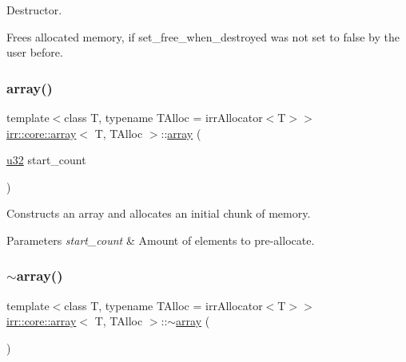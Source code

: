 Destructor. 

Frees allocated memory, if set\+\_\+free\+\_\+when\+\_\+destroyed was not set to false by the user before. \mbox{\label{classirr_1_1core_1_1array_ab58c4b2c09693190b43ee16e99722b43}} 
\subsubsection{\texorpdfstring{array()}{array()}\hspace{0.1cm}{\footnotesize\ttfamily [2/2]}}
{\footnotesize\ttfamily template$<$class T, typename T\+Alloc = irr\+Allocator$<$\+T$>$$>$ \\
\hyperlink{classirr_1_1core_1_1array}{irr\+::core\+::array}$<$ T, T\+Alloc $>$\+::\hyperlink{classirr_1_1core_1_1array}{array} (\begin{DoxyParamCaption}\item[{\hyperlink{namespaceirr_a0416a53257075833e7002efd0a18e804}{u32}}]{start\+\_\+count }\end{DoxyParamCaption})\hspace{0.3cm}{\ttfamily [inline]}}



Constructs an array and allocates an initial chunk of memory. 


\begin{DoxyParams}{Parameters}
{\em start\+\_\+count} & Amount of elements to pre-\/allocate. \\
\hline
\end{DoxyParams}
\mbox{\label{classirr_1_1core_1_1array_aac1853f45d4c18feaacac9859efe9836}} 
\subsubsection{\texorpdfstring{$\sim$array()}{~array()}\hspace{0.1cm}{\footnotesize\ttfamily [2/2]}}
{\footnotesize\ttfamily template$<$class T, typename T\+Alloc = irr\+Allocator$<$\+T$>$$>$ \\
\hyperlink{classirr_1_1core_1_1array}{irr\+::core\+::array}$<$ T, T\+Alloc $>$\+::$\sim$\hyperlink{classirr_1_1core_1_1array}{array} (\begin{DoxyParamCaption}{ }\end{DoxyParamCaption})\hspace{0.3cm}{\ttfamily [inline]}}



